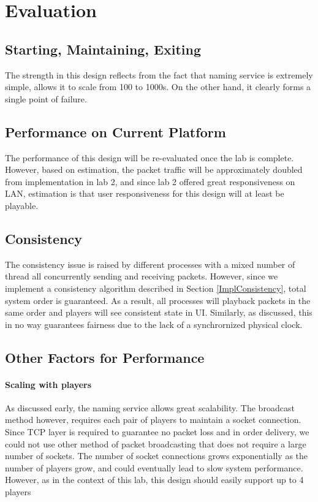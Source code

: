 \section{Evaluation}\label{Evaluation}

\subsection{Starting, Maintaining, Exiting}

The strength in this design reflects from the fact that naming service is extremely simple, allows it to scale from 100 to 1000s. On the other hand, it clearly forms a single point of failure. 

\subsection{Performance on Current Platform}

The performance of this design will be re-evaluated once the lab is complete. However, based on estimation, the packet traffic will be approximately doubled from implementation in lab 2, and since lab 2 offered great responsiveness on LAN, estimation is that user responsiveness for this design will at least be playable.

\subsection{Consistency}

The consistency issue is raised by different processes with a mixed number of thread all concurrently sending and receiving packets. However, since we implement a consistency algorithm described in Section \ref{ImplConsistency}, total system order is guaranteed. As a result, all processes will playback packets in the same order and players will see consistent state in UI. Similarly, as discussed, this in no way guarantees fairness due to the lack of a synchrornized physical clock.

\subsection{Other Factors for Performance}

\paragraph*{Scaling with players}

As discussed early, the naming service allows great scalability. The broadcast method however, requires each pair of players to maintain a socket connection. Since TCP layer is required to guarantee no packet loss and in order delivery, we could not use other method of packet broadcasting that does not require a large number of sockets. The number of socket connections grows exponentially as the number of players grow, and could eventually lead to slow system performance. However, as in the context of this lab, this design should easily support up to 4 players

